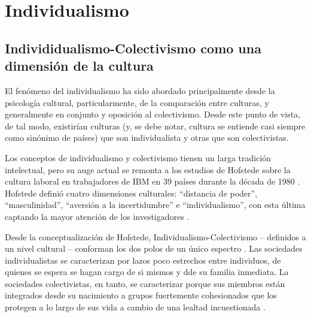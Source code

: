 \documentclass[12pt,twoside]{templates/facsothesis}
\begin{document}
\hypertarget{individualismo}{%
\section{Individualismo}\label{individualismo}}

\hypertarget{individidualismo-colectivismo-como-una-dimensiuxf3n-de-la-cultura}{%
\subsection{Individidualismo-Colectivismo como una dimensión de la cultura}\label{individidualismo-colectivismo-como-una-dimensiuxf3n-de-la-cultura}}

El fenómeno del individualismo ha sido abordado principalmente desde la psicología cultural, particularmente, de la comparación entre culturas, y generalmente en conjunto y oposición al colectivismo. Desde este punto de vista, de tal modo, existirían culturas (y, se debe notar, cultura se entiende casi siempre como sinónimo de países) que son individualista y otras que son colectivistas.

Los conceptos de individualismo y colectivismo tienen un larga tradición intelectual, pero su auge actual se remonta a los estudios de Hofstede sobre la cultura laboral en trabajadores de IBM en 39 países durante la década de 1980 \citep{oyserman2002}. Hofstede definió cuatro dimensiones culturales: ``distancia de poder'', ``masculinidad'', ``aversión a la incertidumbre'' e ``individualismo'', con esta última captando la mayor atención de los investigadores \citep{brewer2007}.

Desde la conceptualización de Hofstede, Individualismo-Colectivismo -- definidos a un nivel cultural -- conforman los dos polos de un único espectro \citep{oyserman2002}. Las sociedades individualistas se caracterizan por lazos poco estrechos entre individuos, de quienes se espera se hagan cargo de si mismos y dde su familia inmediata. La sociedades colectivistas, en tanto, se caracterizar porque sus miembros están integrados desde su nacimiento a grupos fuertemente cohesionados que los protegen a lo largo de sus vida a cambio de una lealtad incuestionada \citep{yoon2010}.
\end{document}
